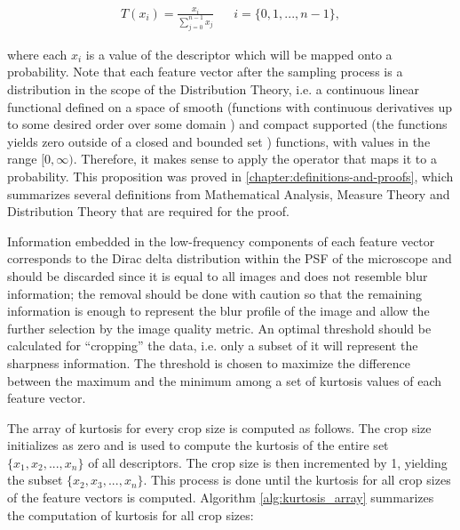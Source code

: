 \begin{align}
\label{eqn:probability_operator}
T(x_{i}) = \frac{x_{i}}{\sum_{j=0}^{n-1}x_{j}}
&&  i = \{0,1,...,n-1\},
\end{align}

\noindent where each $x_{i}$ is a value of the descriptor which will be mapped onto a probability. Note that each feature vector after the sampling process is a distribution in the scope of the Distribution Theory, i.e. a continuous linear functional defined on a space of smooth (functions with continuous derivatives up to some desired order over some domain \cite{weisstein2020smooth}) and compact supported (the functions yields zero outside of a closed and bounded set \cite{weisstein2020compact}) functions, with values in the range $[0,\infty)$. Therefore, it makes sense to apply the operator that maps it to a probability. This proposition was proved in \autoref{chapter:definitions-and-proofs}, which summarizes several definitions from Mathematical Analysis, Measure Theory and Distribution Theory that are required for the proof.

Information embedded in the low-frequency components of each feature vector corresponds to the Dirac delta distribution within the PSF of the microscope and should be discarded since it is equal to all images and does not resemble blur information; the removal should be done with caution so that the remaining information is enough to represent the blur profile of the image and allow the further selection by the image quality metric. An optimal threshold should be calculated for ``cropping'' the data, i.e. only a subset of it will represent the sharpness information. The threshold is chosen to maximize the difference between the maximum and the minimum among a set of kurtosis values of each feature vector.

The array of kurtosis for every crop size is computed as follows. The crop size initializes as zero and is used to compute the kurtosis of the entire set $\{x_{1},x_{2},...,x_{n}\}$ of all descriptors. The crop size is then incremented by 1, yielding the subset $\{x_{2},x_{3},...,x_{n}\}$. This process is done until the kurtosis for all crop sizes of the feature vectors is computed. Algorithm \ref{alg:kurtosis_array} summarizes the computation of kurtosis for all crop sizes:

